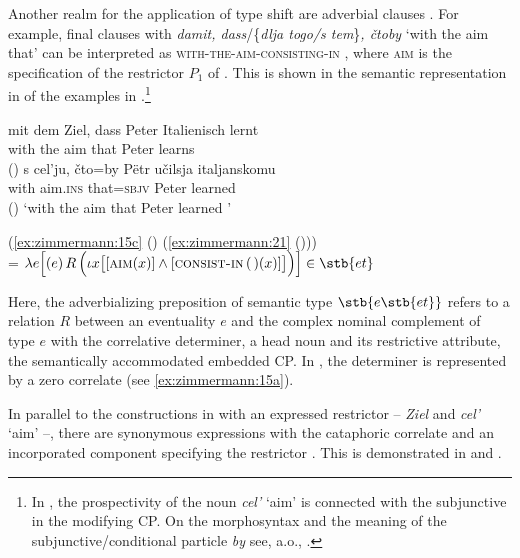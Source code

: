 \documentclass[output=paper]{langscibook}
\begin{document}
\noindent Another realm for the application of type shift  are adverbial clauses \citep{Zimmermann2018a,Zimmermann2019c,Zimmermann2019b}. For example, final clauses with \textit{damit, dass}/\{\textit{dlja togo/s tem}\}\textit{, čtoby} `with the aim that' can be interpreted as \textsc{with-the-aim-consisting-in} , where \textsc{aim} is the specification of the restrictor $P_1$ of . This is shown in the semantic representation in  of the examples in .\footnote{In , the prospectivity of the noun \textit{cel'} `aim' is connected with the subjunctive in the modifying CP. On the morphosyntax and the meaning of the subjunctive/conditional particle \textit{by} see, a.o., \citet{Zimmermann2015}.}

\ea\label{ex:zimmermann:23}
    \ea\label{ex:zimmermann:23a} \gll mit dem Ziel, dass Peter Italienisch lernt\\
    with the aim that Peter  learns \\ \hfill ()
    \ex\label{ex:zimmermann:23b} \gll s cel'ju, čto=by Pëtr učilsja italjanskomu\\
    with aim.\textsc{ins} that=\textsc{sbjv} Peter learned  \\ \hfill ()
    \z
    \glt `with the aim that Peter learned '
\z

\ea\label{ex:zimmermann:24}
 \hphantom{=}  \Big(\ref{ex:zimmermann:15c} () \big(\ref{ex:zimmermann:21} ()\big)\Big)\\
 = $\lambda e \Big[(e) \, R \, \Big(\iota x \big[[\textsc{aim} (x)] \wedge [\textsc{consist-in} \, ($$) (x)]\big]\Big)\Big] \in \stb{et}$
\z

\noindent Here, the adverbializing preposition of semantic type $\stb{e\stb{et}}$ refers to a relation $R$ between an eventuality $e$ and the complex nominal complement of type $e$ with the correlative determiner, a head noun and its restrictive attribute, the semantically accommodated embedded CP. In , the determiner is represented by a zero correlate (see \ref{ex:zimmermann:15a}).

In parallel to the constructions in  with an expressed restrictor --  \textit{Ziel} and  \textit{cel'} `aim' --, there are synonymous expressions with the cataphoric correlate and an incorporated component specifying the restrictor \citep{Zimmermann2019c}. This is demonstrated in  and .
\end{document}
